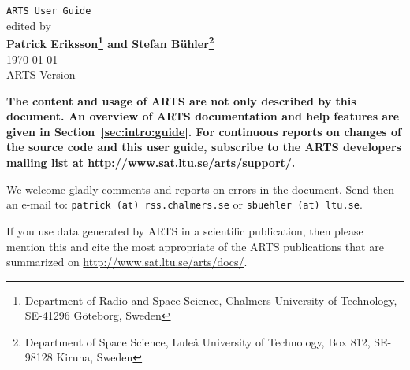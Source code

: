 





%
\renewcommand{\thepage}{title \arabic{page}} 

\thispagestyle{plain}
\begin{center}
  \vspace*{2cm}
  {\Huge \verb|ARTS User Guide|\\}
  \vspace*{1cm}
  {\large edited by \\}
  \vspace*{1cm}
  {\Large \bf Patrick Eriksson\footnote{
      Department of Radio and Space Science, 
      Chalmers University of Technology, SE-41296 G\"oteborg, Sweden} 
      and
    Stefan B\"uhler\footnote{
      Department of Space Science,
      Lule{\aa} University of Technology,
      Box 812, SE-98128 Kiruna, Sweden}  
    }\\
   \vspace*{2cm}
   {\large \today\\
    ARTS Version 
   }
\end{center}
\vspace*{4cm}
{\normalsize \bf
  \noindent
  The content and usage of ARTS are not only described by this
  document. An overview of ARTS documentation and help features are
  given in Section~\ref{sec:intro:guide}. For continuous reports on
  changes of the source code and this user guide, subscribe to the
  ARTS developers mailing list at \url{http://www.sat.ltu.se/arts/support/}.

  We welcome gladly comments and reports on errors in the document.
  Send then an e-mail to: \verb|patrick (at) rss.chalmers.se| or 
  \verb|sbuehler (at) ltu.se|.

  If you use data generated by ARTS in a scientific
  publication, then please mention this and cite the most
  appropriate of the ARTS publications that are summarized on
  \url{http://www.sat.ltu.se/arts/docs/}.
}

